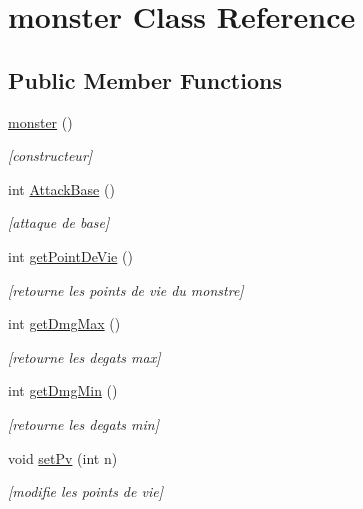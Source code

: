 \hypertarget{classmonster}{}\section{monster Class Reference}
\label{classmonster}
\subsection*{Public Member Functions}
\begin{DoxyCompactItemize}
\item 
\hyperlink{classmonster_aa06fe45ef2076f6f62b5b84defddcd25}{monster} ()
\begin{DoxyCompactList}\small\item\em \mbox{[}constructeur\mbox{]} \end{DoxyCompactList}\item 
int \hyperlink{classmonster_ab70ff97de57e39e30ed85bb08db6d8fd}{Attack\+Base} ()
\begin{DoxyCompactList}\small\item\em \mbox{[}attaque de base\mbox{]} \end{DoxyCompactList}\item 
int \hyperlink{classmonster_aeef9bc2fd26c874c22db3c087722537a}{get\+Point\+De\+Vie} ()
\begin{DoxyCompactList}\small\item\em \mbox{[}retourne les points de vie du monstre\mbox{]} \end{DoxyCompactList}\item 
int \hyperlink{classmonster_a528d52a39aaf445237242c0f875d55eb}{get\+Dmg\+Max} ()
\begin{DoxyCompactList}\small\item\em \mbox{[}retourne les degats max\mbox{]} \end{DoxyCompactList}\item 
int \hyperlink{classmonster_a50ac9a3b954236cd115357104765ca88}{get\+Dmg\+Min} ()
\begin{DoxyCompactList}\small\item\em \mbox{[}retourne les degats min\mbox{]} \end{DoxyCompactList}\item 
void \hyperlink{classmonster_a55ec03e003cffaaf20ce49269c80f716}{set\+Pv} (int n)
\begin{DoxyCompactList}\small\item\em \mbox{[}modifie les points de vie\mbox{]} \end{DoxyCompactList}\end{DoxyCompactItemize}


